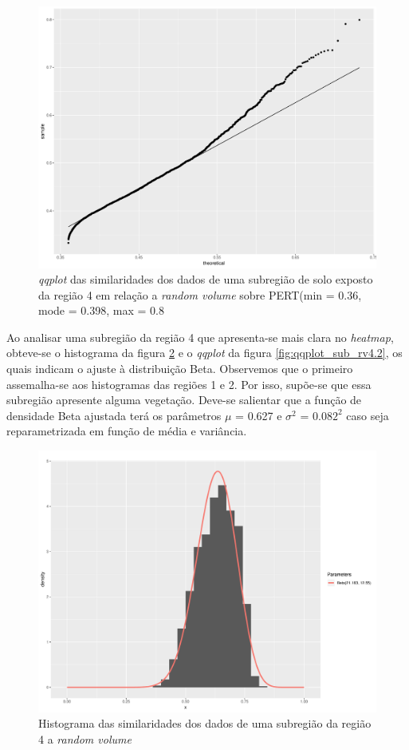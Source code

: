 \documentclass[12pt]{article}
\begin{document}
\begin{figure}[!h]

  \centering
  \includegraphics[width=0.75\linewidth]{../../Figures/Report_19_02_27/qqplot_region4.pdf}
  \caption{\textit{qqplot} das similaridades dos dados de uma subregião de solo exposto da região 4 em relação a \textit{random volume} sobre PERT(min = 0.36, mode = 0.398, max = 0.8}
  \label{fig:qqplot_sub_rv4.1}

\end{figure}

\newpage

Ao analisar uma subregião da região 4 que apresenta-se mais clara no \textit{heatmap}, obteve-se o histograma da figura \ref{fig:hist_sub_rv4.2} e o \textit{qqplot} da figura \ref{fig:qqplot_sub_rv4.2}, os quais indicam o ajuste à distribuição Beta. Observemos que o primeiro assemalha-se aos histogramas das regiões 1 e 2. Por isso, supõe-se que essa subregião apresente alguma vegetação. Deve-se salientar que a função de densidade Beta ajustada terá os parâmetros $\mu$ = 0.627 e ${\sigma}^2$ = $0.082^2$ caso seja reparametrizada em função de média e variância.

\begin{figure}[!h]

  \centering
  \includegraphics[width=0.75\linewidth]{../../Figures/Report_19_02_27/hist_rv_subregion4_2.pdf}
  \caption{Histograma das similaridades dos dados de uma subregião da região 4 a \textit{random volume}}
  \label{fig:hist_sub_rv4.2}

\end{figure}
\end{document}
